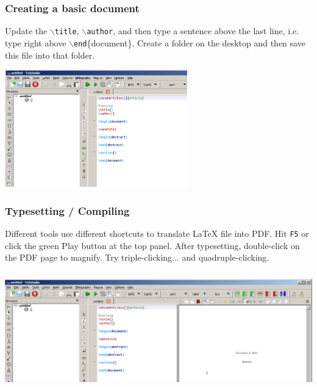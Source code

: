 \documentclass[slidestop,compress,mathserif]{beamer}
\begin{document}
\begin{frame} \frametitle{Creating a basic document}
Update the \texttt{\color{command}$\backslash$title}, \texttt{\color{command}$\backslash$author}, and then type a sentence above the last line, i.e. type right above \texttt{\color{command}$\backslash$end}{\color{braces}\{}document{\color{braces}\}}. Create a folder on the desktop and then save this file into that folder.
	\begin{center}
		\includegraphics[height=2.0in]{basicsOfLatex/gettingStarted/texstudioFirstDocument}
	\end{center}
\end{frame}

\begin{frame} \frametitle{Typesetting / Compiling}
Different tools use different shortcuts to translate LaTeX file into PDF. Hit \texttt{\color{highlight}F5} or click the green {\color{highlight}Play} button at the top panel. After typesetting, double-click on the PDF page to magnify. Try triple-clicking... and quadruple-clicking.
\begin{center}
	\includegraphics[height=2.0in]{basicsOfLatex/gettingStarted/texstudiofirstOutput}
\end{center}
\end{frame}
\end{document}
